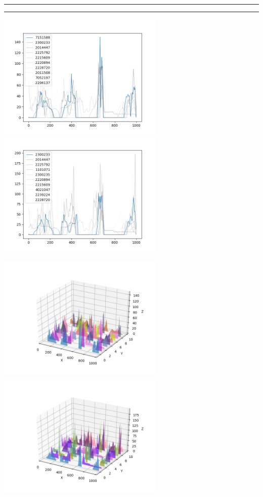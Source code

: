 \documentclass{article}
\begin{document}
\begin{center}
\noindent\rule{\textwidth}{1pt}

\noindent\rule{\textwidth}{1pt}

\includegraphics[height=6cm, width=8cm]{5.png}\includegraphics[height=6cm, width=8cm]{5_cos.png}

\includegraphics[height=6cm, width=8cm]{5_3d.png} \includegraphics[height=6cm, width=8cm]{5_cos_3d.png}


\end{center}
\end{document}
